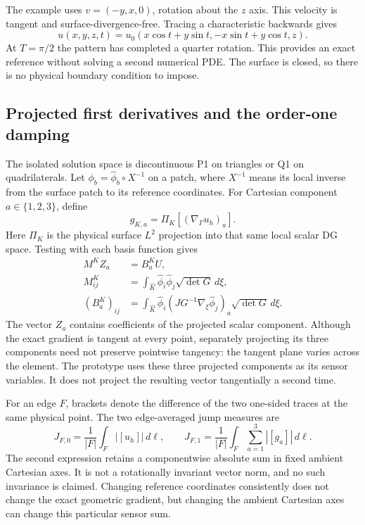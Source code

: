 The example uses $v=(-y,x,0)$, rotation about the $z$ axis. This velocity is
tangent and surface-divergence-free. Tracing a characteristic backwards gives
\begin{equation}
 u(x,y,z,t)=u_0(x\cos t+y\sin t,-x\sin t+y\cos t,z).
\end{equation}
At $T=\pi/2$ the pattern has completed a quarter rotation. This provides an
exact reference without solving a second numerical PDE. The surface is
closed, so there is no physical boundary condition to impose.

\subsection{Projected first derivatives and the order-one damping}
The isolated solution space is discontinuous P1 on triangles or Q1 on
quadrilaterals. Let $\phi_b=\widehat\phi_b\circ X^{-1}$ on a patch, where
$X^{-1}$ means its local inverse from the surface patch to its reference
coordinates. For Cartesian component $a\in\{1,2,3\}$, define
\begin{equation}
 g_{K,a}=\Pi_K[(\nabla_\Gamma u_h)_a].
\end{equation}
Here $\Pi_K$ is the physical surface $L^2$ projection into that same local
scalar DG space. Testing with each basis function gives
\begin{align}
 M^K Z_a&=B_a^K U,\\
 M^K_{ij}&=\int_{\widehat K}\widehat\phi_i\widehat\phi_j
                            \sqrt{\det G}\,d\xi,\\
 (B_a^K)_{ij}&=\int_{\widehat K}\widehat\phi_i
       (J G^{-1}\nabla_\xi\widehat\phi_j)_a\sqrt{\det G}\,d\xi.
\end{align}
The vector $Z_a$ contains coefficients of the projected scalar component.
Although the exact gradient is tangent at every point, separately projecting
its three components need not preserve pointwise tangency: the tangent
plane varies across the element. The prototype uses these three projected
components as its sensor variables. It does not project the resulting
vector tangentially a second time.

For an edge $F$, brackets denote the difference of the two one-sided traces
at the same physical point. The two edge-averaged jump measures are
\begin{equation}
 J_{F,0}=\frac1{|F|}\int_F|[u_h]|\,d\ell,\qquad
 J_{F,1}=\frac1{|F|}\int_F\sum_{a=1}^3|[g_a]|\,d\ell.
\end{equation}
The second expression retains a componentwise absolute sum in fixed ambient
Cartesian axes. It is not a rotationally invariant vector norm, and no such
invariance is claimed. Changing reference coordinates consistently does
not change the exact geometric gradient, but changing the ambient Cartesian
axes can change this particular sensor sum.

